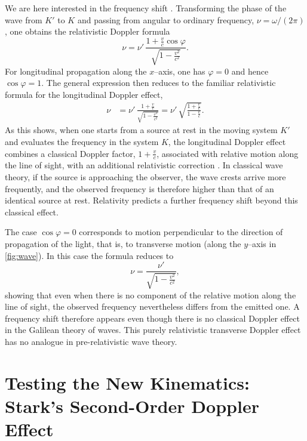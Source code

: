 \documentclass[pdflatex]{sn-jnl}
\begin{document}
We are here interested in the frequency shift \citep[911]{Einstein1905}. Transforming the phase of the wave from $K'$ to $K$ and passing from angular to ordinary frequency, $\nu=\omega/(2\pi)$, one obtains the relativistic Doppler formula
\begin{equation*}
\nu
=\nu'\,\frac{1+\frac{v}{c}\cos\varphi}{\sqrt{1-\frac{v^{2}}{c^{2}}}}.
\end{equation*}
%
For longitudinal propagation along the $x$--axis, one has $\varphi=0$ and hence $\cos\varphi=1$. The general expression then reduces to the familiar relativistic formula for the longitudinal Doppler effect,
\begin{equation*}
\begin{aligned}
\nu
&=\nu'\,\frac{1+\frac{v}{c}}{\sqrt{1-\frac{v^{2}}{c^{2}}}}
=\nu'\,\sqrt{\frac{1+\frac{v}{c}}{1-\frac{v}{c}}}.
\end{aligned}
\end{equation*}
%
As this shows, when one starts from a source at rest in the moving system $K'$ and evaluates the frequency in the system $K$, the longitudinal Doppler effect combines a classical Doppler factor, $1+\frac{v}{c}$, associated with relative motion along the line of sight, with an additional relativistic correction \gammafactorh. In classical wave theory, if the source is approaching the observer, the wave crests arrive more frequently, and the observed frequency is therefore higher than that of an identical source at rest. Relativity predicts a further frequency shift beyond this classical effect.

The case $\cos\varphi=0$ corresponds to motion perpendicular to the direction of propagation of the light, that is, to transverse motion (along the $y$--axis in \cref{fig:wave}). In this case the formula reduces to
\begin{equation*}
\nu=\frac{\nu'}{\sqrt{1-\frac{v^{2}}{c^{2}}}},
\end{equation*}
%
showing that even when there is no component of the relative motion along the line of sight, the observed frequency nevertheless differs from the emitted one. A frequency shift therefore appears even though there is no classical Doppler effect in the Galilean theory of waves. This purely relativistic transverse Doppler effect has no analogue in pre-relativistic wave theory.

\section{Testing the New Kinematics: Stark’s Second-Order Doppler Effect}
\end{document}
